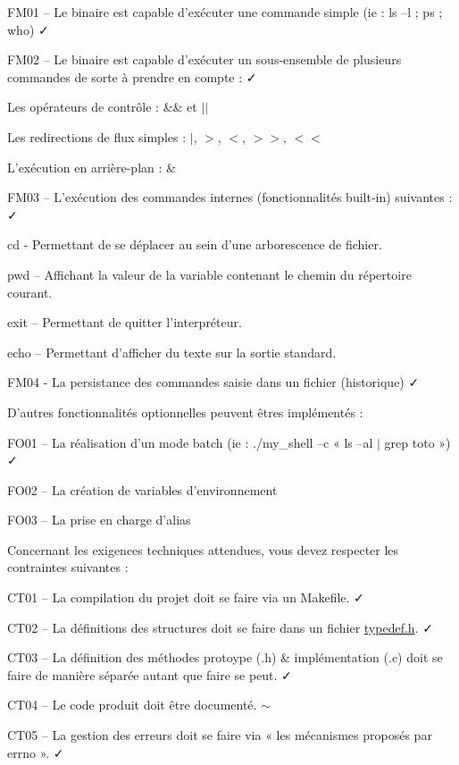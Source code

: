 \begin{DoxyItemize}
\item F\+M01 – Le binaire est capable d’exécuter une commande simple (ie \+: ls –l ; ps ; who) ✓
\item F\+M02 – Le binaire est capable d’exécuter un sous-\/ensemble de plusieurs commandes de sorte à prendre en compte \+: ✓
\begin{DoxyItemize}
\item Les opérateurs de contrôle \+: \&\& et $\vert$$\vert$
\item Les redirections de flux simples \+: $\vert$, $>$, $<$, $>$$>$, $<$$<$
\item L’exécution en arrière-\/plan \+: \&
\end{DoxyItemize}
\item F\+M03 – L’exécution des commandes internes (fonctionnalités built-\/in) suivantes \+: ✓
\begin{DoxyItemize}
\item cd -\/ Permettant de se déplacer au sein d’une arborescence de fichier.
\item pwd – Affichant la valeur de la variable contenant le chemin du répertoire courant.
\item exit – Permettant de quitter l’interpréteur.
\item echo – Permettant d’afficher du texte sur la sortie standard.
\end{DoxyItemize}
\item F\+M04 -\/ La persistance des commandes saisie dans un fichier (historique) ✓
\end{DoxyItemize}

D’autres fonctionnalités optionnelles peuvent êtres implémentés \+:


\begin{DoxyItemize}
\item F\+O01 – La réalisation d’un mode batch (ie \+: ./my\+\_\+shell –c « ls –al $\vert$ grep toto ») ✓
\item F\+O02 – La création de variables d’environnement
\item F\+O03 – La prise en charge d’alias
\end{DoxyItemize}

Concernant les exigences techniques attendues, vous devez respecter les contraintes suivantes \+:


\begin{DoxyItemize}
\item C\+T01 – La compilation du projet doit se faire via un Makefile. ✓
\item C\+T02 – La définitions des structures doit se faire dans un fichier \hyperlink{typedef_8h}{typedef.\+h}. ✓
\item C\+T03 – La définition des méthodes protoype (.h) \& implémentation (.c) doit se faire de manière séparée autant que faire se peut. ✓
\item C\+T04 – Le code produit doit être documenté. $\sim$
\item C\+T05 – La gestion des erreurs doit se faire via « les mécanismes proposés par errno ». ✓
\end{DoxyItemize}

